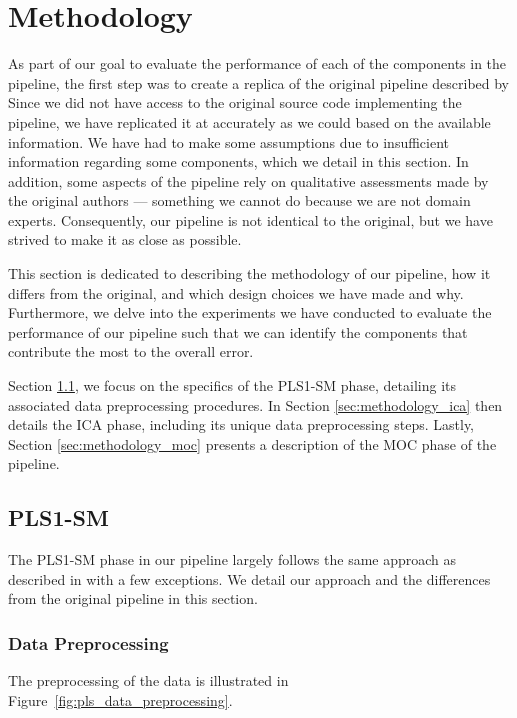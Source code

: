 \section{Methodology}\label{sec:methodology}
As part of our goal to evaluate the performance of each of the components in the pipeline, the first step was to create a replica of the original pipeline described by \citet{cleggRecalibrationMarsScience2017}
Since we did not have access to the original source code implementing the pipeline, we have replicated it at accurately as we could based on the available information.
We have had to make some assumptions due to insufficient information regarding some components, which we detail in this section.
In addition, some aspects of the pipeline rely on qualitative assessments made by the original authors --- something we cannot do because we are not domain experts.
Consequently, our pipeline is not identical to the original, but we have strived to make it as close as possible.

This section is dedicated to describing the methodology of our pipeline, how it differs from the original, and which design choices we have made and why.
Furthermore, we delve into the experiments we have conducted to evaluate the performance of our pipeline such that we can identify the components that contribute the most to the overall error.

Section \ref{sec:methodology_pls1}, we focus on the specifics of the PLS1-SM phase, detailing its associated data preprocessing procedures.
In Section \ref{sec:methodology_ica} then details the ICA phase, including its unique data preprocessing steps.
Lastly, Section \ref{sec:methodology_moc} presents a description of the MOC phase of the pipeline.

\subsection{PLS1-SM}\label{sec:methodology_pls1}
The PLS1-SM phase in our pipeline largely follows the same approach as described in \citet{andersonImprovedAccuracyQuantitative2017} with a few exceptions.
We detail our approach and the differences from the original pipeline in this section.

\subsubsection{Data Preprocessing}\label{sec:pls1_data_preprocessing}
The preprocessing of the data is illustrated in Figure~\ref{fig:pls_data_preprocessing}.

